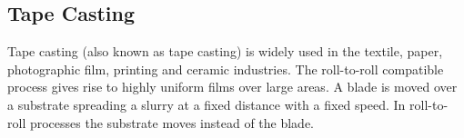 \subsection{Tape Casting}
%
Tape casting (also known as tape casting) is widely used in the textile, paper, photographic film, printing and ceramic industries.
The roll-to-roll compatible process gives rise to highly uniform films over large areas\cite{yang2010large}.
A blade is moved over a substrate spreading a slurry at a fixed distance with a fixed speed.
In roll-to-roll processes the substrate moves instead of the blade. 

